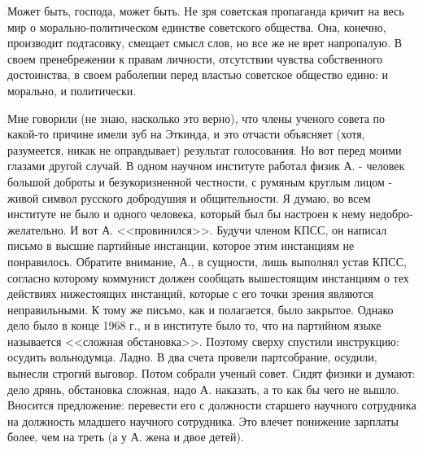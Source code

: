 \documentclass{book}
\begin{document}
Может быть, господа, может быть. Не зря советская пропа­ганда кричит на весь мир о морально-политическом единстве советского общества. Она, конечно, производит подтасовку, смещает смысл слов, но все же не врет напропалую. В своем пренебрежении к правам личности, отсутствии чувства собст­венного достоинства, в своем раболепии перед властью совет­ское общество едино: и морально, и политически.

Мне говорили (не знаю, насколько это верно), что члены ученого совета по какой-то причине имели зуб на Эткинда, и это отчасти объясняет (хотя, разумеется, никак не оправды­вает) результат голосования. Но вот перед моими глазами другой случай. В одном научном институте работал физик А. - человек большой доброты и безукоризненной честности, с ру­мяным круглым лицом - живой символ русского доброду­шия и общительности. Я думаю, во всем институте не было и одного человека, который был бы настроен к нему недобро­желательно. И вот А. <<провинился>>. Будучи членом КПСС, он написал письмо в высшие партийные инстанции, которое этим инстанциям не понравилось. Обратите внимание, А., в сущ­ности, лишь выполнял устав КПСС, согласно которому комму­нист должен сообщать вышестоящим инстанциям о тех дейст­виях нижестоящих инстанций, которые с его точки зрения являются неправильными. К тому же письмо, как и полагает­ся, было закрытое. Однако дело было в конце 1968 г., и в институте было то, что на партийном языке называется <<слож­ная обстановка>>. Поэтому сверху спустили инструкцию: осу­дить вольнодумца. Ладно. В два счета провели партсобрание, осудили, вынесли строгий выговор. Потом собрали ученый со­вет. Сидят физики и думают: дело дрянь, обстановка сложная, надо А. наказать, а то как бы чего не вышло. Вносится предло­жение: перевести его с должности старшего научного сотруд­ника на должность младшего научного сотрудника. Это вле­чет понижение зарплаты более, чем на треть (а у А. жена и двое детей).
\end{document}
